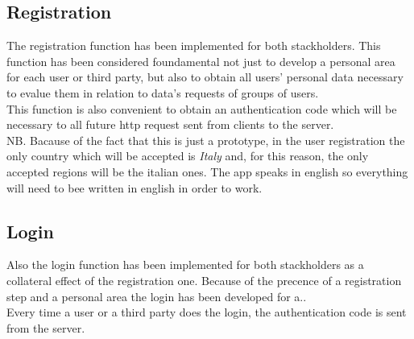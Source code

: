 \subsection{Registration}
The registration function has been implemented for both stackholders. This function has been considered foundamental not just to develop a personal area for each user or third party, but also to obtain all  users' personal data necessary to evalue them in relation to data's requests of groups of users.\\
This function is also convenient to obtain an authentication code which will be necessary to all future http request sent from clients to the server. \\
NB. Bacause of the fact that this is just a prototype, in the user registration the only country which will be accepted is \textit{Italy} and, for this reason, the only accepted regions will be the italian ones. The app speaks in english so everything will need to bee written in english in order to work.

\subsection{Login}
Also the login function has been implemented for both stackholders as a collateral effect of the registration one. Because of the precence of a registration step and a personal area the login has been developed for a..\\
Every time a user or a third party does the login, the authentication code is sent from the server.

